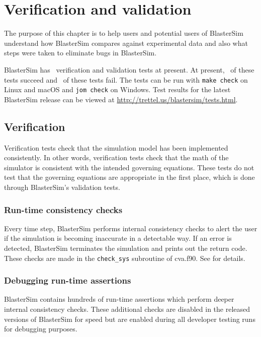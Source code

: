 \chapter{Verification and validation}\label{verval}

The purpose of this chapter is to help users and potential users of BlasterSim understand how BlasterSim compares against experimental data and also what steps were taken to eliminate bugs in BlasterSim.


BlasterSim has \totaltests\ verification and validation tests at present.
At present, \totalsuccesses\ of these tests succeed and \totalfailures\ of these tests fail.
The tests can be run with \texttt{make check} on Linux and macOS and \texttt{jom check} on Windows.
Test results for the latest BlasterSim release can be viewed at \url{http://trettel.us/blastersim/tests.html}.

\section{Verification}\label{verification}

Verification tests check that the simulation model has been implemented consistently.
In other words, verification tests check that the math of the simulator is consistent with the intended governing equations.
These tests do not test that the governing equations are appropriate in the first place, which is done through BlasterSim's validation tests.

\subsection{Run-time consistency checks}\label{run-time-checks}

Every time step, BlasterSim performs internal consistency checks to alert the user if the simulation is becoming inaccurate in a detectable way.
If an error is detected, BlasterSim terminates the simulation and prints out the return code.
These checks are made in the \texttt{check\_sys} subroutine of cva.f90.
See  for details.

\subsection{Debugging run-time assertions}\label{assertions}

BlasterSim contains hundreds of run-time assertions which perform deeper internal consistency checks.
These additional checks are disabled in the released versions of BlasterSim for speed but are enabled during all developer testing runs for debugging purposes.

